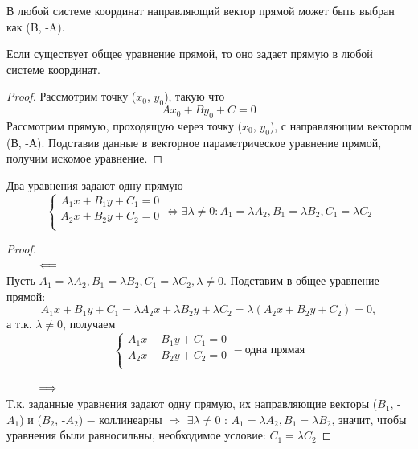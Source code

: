 \begin{corollary}
    В любой системе координат направляющий вектор прямой может быть выбран как (B, -A).
\end{corollary}

\begin{theorem}
    Если существует общее уравнение прямой, то оно задает прямую в любой системе координат.
\end{theorem}
\begin{proof}
    Рассмотрим точку ($x_0$, $y_0$), такую что
    \[
    Ax_0 + By_0 + C = 0
    \]
    Рассмотрим прямую, проходящую через точку ($x_0$, $y_0$), с направляющим вектором (В, -А). Подставив данные в векторное параметрическое уравнение прямой, получим искомое уравнение.
\end{proof}

\begin{theorem}
    Два уравнения задают одну прямую
    \[
    \begin{cases}
        A_1 x + B_1 y + C_1 = 0\\
        A_2 x + B_2 y + C_2 = 0\\
    \end{cases} \Longleftrightarrow \exists\lambda\neq 0 : A_1 = \lambda A_2, B_1 = \lambda B_2, C_1 = \lambda C_2
    \]
\end{theorem}
\begin{proof}
    \tab\\
    $\hspace*{1cm}\Longleftarrow$\\
    Пусть $A_1 = \lambda A_2, B_1 = \lambda B_2, C_1 = \lambda C_2, \lambda\neq 0$. Подставим в общее уравнение прямой:
    \[
    A_1 x + B_1 y + C_1 = \lambda A_2 x + \lambda B_2 y + \lambda C_2 = \lambda(A_2 x + B_2 y + C_2) = 0,
    \]
    а т.к. $\lambda\neq 0$, получаем
    \[
    \begin{cases}
        A_1 x + B_1 y + C_1 = 0\\
        A_2 x + B_2 y + C_2 = 0\\
    \end{cases} - \text{одна прямая}
    \]

    $\hspace*{1cm}\Longrightarrow$\\
    Т.к. заданные уравнения задают одну прямую, их направляющие векторы ($B_1$, -$A_1$) и ($B_2$, -$A_2$) $-$ коллинеарны $\Longrightarrow$ $\exists\lambda\neq 0$ : $A_1 = \lambda A_2, B_1 = \lambda B_2$, значит, чтобы уравнения были равносильны, необходимое условие: $C_1 = \lambda C_2$
\end{proof}

